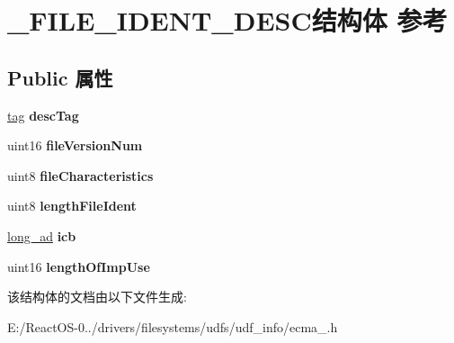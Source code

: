 \hypertarget{struct___f_i_l_e___i_d_e_n_t___d_e_s_c}{}\section{\+\_\+\+F\+I\+L\+E\+\_\+\+I\+D\+E\+N\+T\+\_\+\+D\+E\+S\+C结构体 参考}
\label{struct___f_i_l_e___i_d_e_n_t___d_e_s_c}
\subsection*{Public 属性}
\begin{DoxyCompactItemize}
\item 
\mbox{\label{struct___f_i_l_e___i_d_e_n_t___d_e_s_c_a5e54cd9e669a4fdaa39556d348ddc3d1}} 
\hyperlink{structtag}{tag} {\bfseries desc\+Tag}
\item 
\mbox{\label{struct___f_i_l_e___i_d_e_n_t___d_e_s_c_a938b7155afbcdfbd914b79c49f7713be}} 
uint16 {\bfseries file\+Version\+Num}
\item 
\mbox{\label{struct___f_i_l_e___i_d_e_n_t___d_e_s_c_a9c7452fa83c7332fff4bb23b7487a34b}} 
uint8 {\bfseries file\+Characteristics}
\item 
\mbox{\label{struct___f_i_l_e___i_d_e_n_t___d_e_s_c_a94824bd9c48c2058b4407f133ddff225}} 
uint8 {\bfseries length\+File\+Ident}
\item 
\mbox{\label{struct___f_i_l_e___i_d_e_n_t___d_e_s_c_abf2179e76e5402270f95faf6da83bc9f}} 
\hyperlink{structlong__ad}{long\+\_\+ad} {\bfseries icb}
\item 
\mbox{\label{struct___f_i_l_e___i_d_e_n_t___d_e_s_c_a0a0e82b916d7045e0810c1c1ca72c1d6}} 
uint16 {\bfseries length\+Of\+Imp\+Use}
\end{DoxyCompactItemize}


该结构体的文档由以下文件生成\+:\begin{DoxyCompactItemize}
\item 
E\+:/\+React\+O\+S-\/0../drivers/filesystems/udfs/udf\+\_\+info/ecma\+\_.\+h\end{DoxyCompactItemize}
